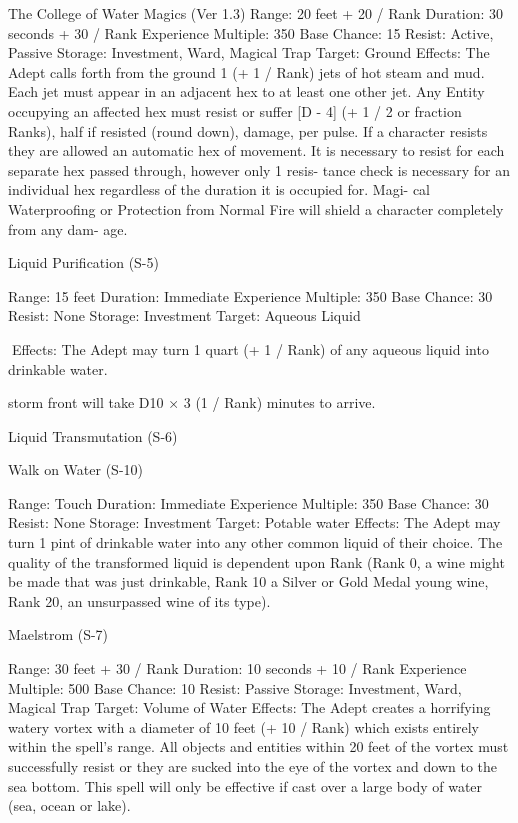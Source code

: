 \begin{Chapter}{The College of Water Magics (Ver 1.3)}
Range: 20 feet + 20 / Rank 
Duration: 30 seconds + 30 / Rank 
Experience Multiple: 350 
Base Chance: 15%
Resist: Active, Passive 
Storage: Investment, Ward, Magical Trap 
Target: Ground 
Effects: The Adept calls forth from the ground 1 (+ 
1 / Rank) jets of hot steam and mud. Each jet must 
appear  in  an  adjacent hex  to  at  least one  other  jet. 
Any  Entity  occupying  an  affected  hex  must  resist 
or suffer [D - 4] (+ 1 / 2 or fraction Ranks), half if 
resisted  (round  down),  damage,  per  pulse.  If  a 
character resists they are allowed an automatic hex 
of  movement.  It  is  necessary  to  resist  for  each 
separate hex passed through, however only 1 resis-
tance  check  is  necessary  for  an  individual  hex 
regardless of the duration it is occupied for. Magi-
cal Waterproofing  or  Protection  from Normal  Fire 
will  shield  a  character  completely  from  any  dam-
age. 

Liquid Purification (S-5) 

Range: 15 feet 
Duration: Immediate 
Experience Multiple: 350 
Base Chance: 30%
Resist: None 
Storage: Investment 
Target: Aqueous Liquid 

Effects: The Adept may turn 1 quart (+ 1 / Rank) of 
any aqueous liquid into drinkable water. 

storm front will take D10 × 3 (1 / Rank) minutes to 
arrive. 

Liquid Transmutation (S-6) 

Walk on Water (S-10) 

Range: Touch 
Duration: Immediate 
Experience Multiple: 350 
Base Chance: 30%
Resist: None 
Storage: Investment 
Target: Potable water 
Effects:  The  Adept  may  turn  1  pint  of  drinkable 
water into any other common liquid of their choice. 
The quality of the transformed liquid is dependent 
upon  Rank  (Rank  0,  a  wine  might  be  made  that 
was just drinkable, Rank 10 a Silver or Gold Medal 
young  wine,  Rank  20,  an  unsurpassed  wine  of  its 
type). 

Maelstrom (S-7) 

Range: 30 feet + 30 / Rank 
Duration: 10 seconds + 10 / Rank 
Experience Multiple: 500 
Base Chance: 10%
Resist: Passive 
Storage: Investment, Ward, Magical Trap 
Target: Volume of Water 
Effects:  The  Adept  creates  a  horrifying  watery 
vortex  with  a  diameter  of  10  feet  (+  10  /  Rank) 
which  exists  entirely  within  the  spell’s  range.  All 
objects  and  entities  within  20  feet  of  the  vortex 
must successfully resist or they are sucked into the 
eye of the vortex and down to the sea bottom. This 
spell will only be effective if cast over a large body 
of water (sea, ocean or lake). 


\end{Chapter}
